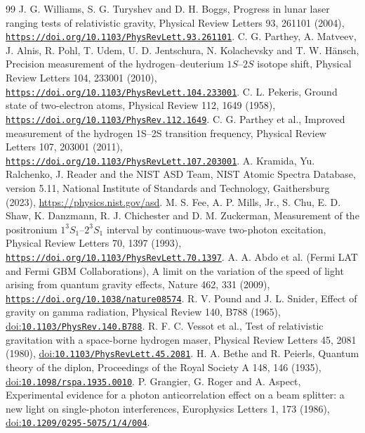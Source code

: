 \documentclass[pdflatex,sn-mathphys-num]{sn-jnl}
\theoremstyle{thmstyleone}
\begin{document}
\begin{thebibliography}{99}
 J. G. Williams, S. G. Turyshev and D. H. Boggs, Progress in lunar laser ranging tests of relativistic gravity, Physical Review Letters 93, 261101 (2004), \href{https://doi.org/10.1103/PhysRevLett.93.261101}{\nolinkurl{https://doi.org/10.1103/PhysRevLett.93.261101}}.
 C. G. Parthey, A. Matveev, J. Alnis, R. Pohl, T. Udem, U. D. Jentschura, N. Kolachevsky and T. W. H\"ansch, Precision measurement of the hydrogen--deuterium $1S$--$2S$ isotope shift, Physical Review Letters 104, 233001 (2010), \href{https://doi.org/10.1103/PhysRevLett.104.233001}{\nolinkurl{https://doi.org/10.1103/PhysRevLett.104.233001}}.
 C. L. Pekeris, Ground state of two-electron atoms, Physical Review 112, 1649 (1958), \href{https://doi.org/10.1103/PhysRev.112.1649}{\nolinkurl{https://doi.org/10.1103/PhysRev.112.1649}}.
 C. G. Parthey et al., Improved measurement of the hydrogen 1S--2S transition frequency, Physical Review Letters 107, 203001 (2011), \href{https://doi.org/10.1103/PhysRevLett.107.203001}{\nolinkurl{https://doi.org/10.1103/PhysRevLett.107.203001}}.
 A. Kramida, Yu. Ralchenko, J. Reader and the NIST ASD Team, NIST Atomic Spectra Database, version 5.11, National Institute of Standards and Technology, Gaithersburg (2023), \url{https://physics.nist.gov/asd}.
 M. S. Fee, A. P. Mills, Jr., S. Chu, E. D. Shaw, K. Danzmann, R. J. Chichester and D. M. Zuckerman, Measurement of the positronium $1^3S_1$--$2^3S_1$ interval by continuous-wave two-photon excitation, Physical Review Letters 70, 1397 (1993), \href{https://doi.org/10.1103/PhysRevLett.70.1397}{\nolinkurl{https://doi.org/10.1103/PhysRevLett.70.1397}}.
 A. A. Abdo et al. (Fermi LAT and Fermi GBM Collaborations), A limit on the variation of the speed of light arising from quantum gravity effects, Nature 462, 331 (2009), \href{https://doi.org/10.1038/nature08574}{\nolinkurl{https://doi.org/10.1038/nature08574}}.
 R. V. Pound and J. L. Snider, Effect of gravity on gamma radiation, Physical Review 140, B788 (1965), \href{https://doi.org/10.1103/PhysRev.140.B788}{doi:\nolinkurl{10.1103/PhysRev.140.B788}}.
 R. F. C. Vessot et al., Test of relativistic gravitation with a space-borne hydrogen maser, Physical Review Letters 45, 2081 (1980), \href{https://doi.org/10.1103/PhysRevLett.45.2081}{doi:\nolinkurl{10.1103/PhysRevLett.45.2081}}.
 H. A. Bethe and R. Peierls, Quantum theory of the diplon, Proceedings of the Royal Society A 148, 146 (1935), \href{https://doi.org/10.1098/rspa.1935.0010}{doi:\nolinkurl{10.1098/rspa.1935.0010}}.
 P. Grangier, G. Roger and A. Aspect, Experimental evidence for a photon anticorrelation effect on a beam splitter: a new light on single-photon interferences, Europhysics Letters 1, 173 (1986), \href{https://doi.org/10.1209/0295-5075/1/4/004}{doi:\nolinkurl{10.1209/0295-5075/1/4/004}}.
\end{thebibliography}
\end{document}
